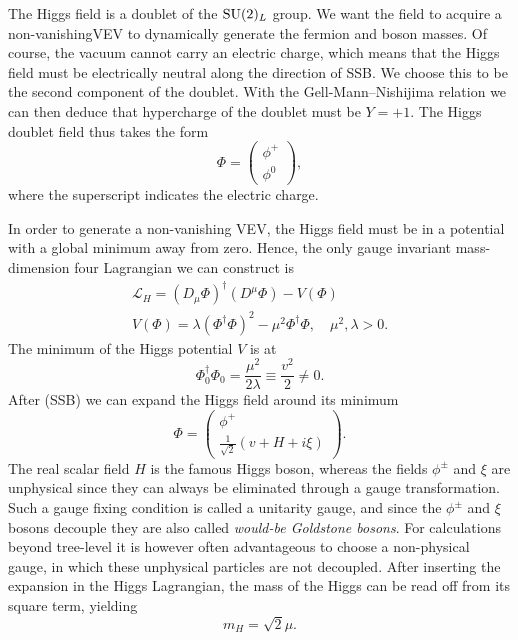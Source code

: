 The Higgs field is a doublet of the $\mathrm{SU}(2)_L$ group. We want the field to acquire a non-vanishing\acs{VEV} to dynamically generate the fermion and boson masses. Of course, the vacuum cannot carry an electric charge, which means that the Higgs field must be electrically neutral along the direction of \acs{SSB}. We choose this to be the second component of the doublet. With the Gell-Mann--Nishijima relation we can then deduce that hypercharge of the doublet must be $Y = +1$. The Higgs doublet field thus takes the form
\begin{equation}
\Phi = \begin{pmatrix}
  \phi^+ \\
  \phi^0
\end{pmatrix},
\end{equation}
where the superscript indicates the electric charge.

In order to generate a non-vanishing \acs{VEV}, the Higgs field must be in a potential with a global minimum away from zero. Hence, the only gauge invariant mass-dimension four Lagrangian we can construct is
\begin{equation}
\begin{gathered}
\mathcal{L}_H = \left( D_\mu \Phi \right)^\dagger \left( D^\mu \Phi \right) - V(\Phi) \\
V(\Phi) = \lambda (\Phi^\dagger \Phi )^2 - \mu^2 \Phi^\dagger \Phi, \quad \mu^2, \lambda > 0.
\end{gathered}
\label{eq:2:Higgs_Lagrangian}
\end{equation}
The minimum of the Higgs potential $V$ is at
\begin{equation}
\Phi_0^\dagger \Phi_0 = \frac{\mu^2}{2 \lambda} \equiv \frac{v^2}{2} \neq 0.
\end{equation}
After (\acs{SSB}) we can expand the Higgs field around its minimum
\begin{equation}
\Phi = \begin{pmatrix}
  \phi^+ \\
  \frac{1}{\sqrt{2}} ( v + H + i \xi )
\end{pmatrix}.
\end{equation}
The real scalar field $H$ is the famous Higgs boson, whereas the fields $\phi^\pm$ and $\xi$ are unphysical since they can always be eliminated through a gauge transformation. Such a gauge fixing condition is called a unitarity gauge, and since the $\phi^\pm$ and $\xi$ bosons decouple they are also called \textit{would-be Goldstone bosons}. For calculations beyond tree-level it is however often advantageous to choose a non-physical gauge, in which these unphysical particles are not decoupled. After inserting the expansion in the Higgs Lagrangian, the mass of the Higgs can be read off from its square term, yielding
\begin{equation}
m_H = \sqrt{2} \mu.
\end{equation}


